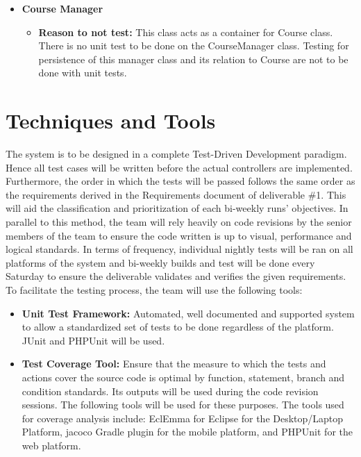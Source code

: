 \documentclass[12pt]{report}
\begin{document}
    \begin{itemize}
    	\item \textbf{Course Manager}
    	\begin{itemize}
    		\item \textbf{Reason to not test:} This class acts as a container for Course class. There is no unit test to be done on the CourseManager class. Testing for persistence of this manager class and its relation to Course are not to be done with unit tests.
    	\end{itemize}
    \end{itemize}
    
    \section{Techniques and Tools}
    
    The system is to be designed in a complete Test-Driven Development paradigm. Hence all test
    cases will be written before the actual controllers are implemented. Furthermore, the order in
    which the tests will be passed follows the same order as the requirements derived in the
    Requirements document of deliverable \#1. This will aid the classification and prioritization of
    each bi-weekly runs' objectives. In parallel to this method, the team will rely heavily on code
    revisions by the senior members of the team to ensure the code written is up to visual,
    performance and logical standards. In terms of frequency, individual nightly tests will be ran
    on all platforms of the system and bi-weekly builds and test will be done every Saturday to
    ensure the deliverable validates and verifies the given requirements. To facilitate the testing
    process, the team will use the following tools:
    
    \begin{itemize}
    	\item \textbf{Unit Test Framework:} Automated, well documented and supported system to allow a standardized set of tests to be done regardless of the platform. JUnit and PHPUnit will be used.
    	\item \textbf{Test Coverage Tool:} Ensure that the measure to which the tests and actions cover the source code is optimal by function, statement, branch and condition standards. Its outputs will be used during the code revision sessions. The following tools will be used for these purposes. The tools used for coverage analysis include: EclEmma for Eclipse for the Desktop/Laptop Platform, jacoco Gradle plugin for the mobile platform, and PHPUnit for the web platform.
    \end{itemize}
    
\end{document}
